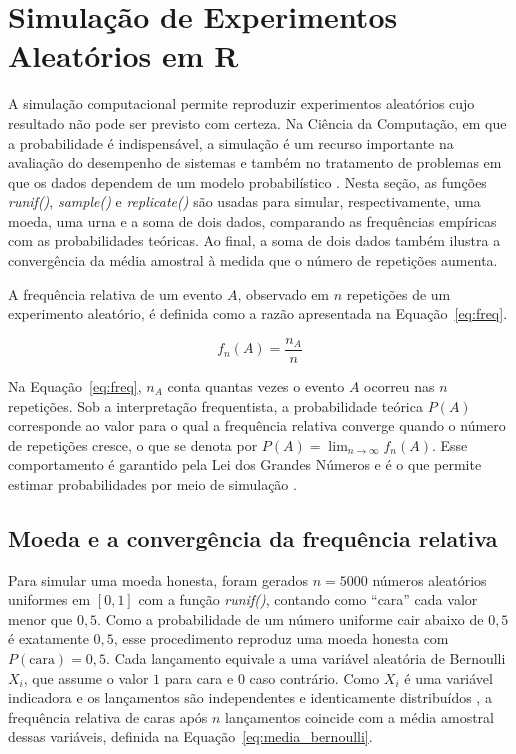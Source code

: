 \section{Simulação de Experimentos Aleatórios em R}

A simulação computacional permite reproduzir experimentos aleatórios cujo
resultado não pode ser previsto com certeza. Na Ciência da Computação, em que a
probabilidade é indispensável, a simulação é um recurso importante na avaliação
do desempenho de sistemas \cite{harcholbalter2024probability} e também no
tratamento de problemas em que os dados dependem de um modelo
probabilístico \cite{chan2021probability}. Nesta seção, as funções
\textit{runif()}, \textit{sample()} e \textit{replicate()} são usadas para simular,
respectivamente, uma moeda, uma urna e a soma de dois dados, comparando as
frequências empíricas com as probabilidades teóricas. Ao final, a soma de dois
dados também ilustra a convergência da média amostral à medida que o número de
repetições aumenta.

A frequência relativa de um evento $A$, observado em $n$ repetições de um
experimento aleatório, é definida como a razão apresentada na
Equação~\ref{eq:freq}.

\begin{equation}
	f_n(A) = \frac{n_A}{n}
	\label{eq:freq}
\end{equation}

Na Equação~\ref{eq:freq}, $n_A$ conta quantas vezes o evento $A$ ocorreu nas $n$
repetições. Sob a interpretação frequentista, a probabilidade teórica $P(A)$
corresponde ao valor para o qual a frequência relativa converge quando o número
de repetições cresce, o que se denota por
$P(A) = \lim_{n \to \infty} f_n(A)$. Esse comportamento é garantido pela Lei dos
Grandes Números e é o que permite estimar
probabilidades por meio de simulação \cite{ross2010probabilidade}.

\subsection{Moeda e a convergência da frequência relativa}

Para simular uma moeda honesta, foram gerados $n = 5000$ números aleatórios
uniformes em $[0,1]$ com a função \textit{runif()}, contando como ``cara'' cada
valor menor que $0{,}5$. Como a probabilidade de um número uniforme cair abaixo de
$0{,}5$ é exatamente $0{,}5$, esse procedimento reproduz uma moeda honesta com
$P(\text{cara}) = 0{,}5$. Cada lançamento equivale a uma variável aleatória de
Bernoulli $X_i$, que assume o valor $1$ para cara e $0$ caso contrário. Como $X_i$
é uma variável indicadora e os lançamentos são independentes e identicamente
distribuídos \cite{harcholbalter2024probability}, a frequência relativa de caras
após $n$ lançamentos coincide com a média amostral dessas variáveis, definida na
Equação~\ref{eq:media_bernoulli}.

